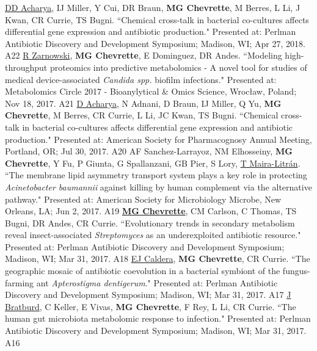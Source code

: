 \begin{cvpubs}
  \cvpub
    {\underline{DD Acharya}, IJ Miller, Y Cui, DR Braun, \textbf{MG Chevrette}, M Berres, L Li, J Kwan, CR Currie, TS Bugni. ``Chemical cross-talk in bacterial co-cultures affects differential gene expression and antibiotic production." Presented at: Perlman Antibiotic Discovery and Development Symposium; Madison, WI; Apr 27, 2018.} %
    {A22} %
  \cvpub
    {\underline{R Zarnowski}, \textbf{MG Chevrette}, E Dominguez, DR Andes. ``Modeling high-throughput proteomics into predictive metabolomics - A novel tool for studies of medical device-associated \textit{Candida spp.} biofilm infections." Presented at: Metabolomics Circle 2017 - Bioanylytical \& Omics Science, Wrocław, Poland; Nov 18, 2017.} %
    {A21} %
  \cvpub
    {\underline{D Acharya}, N Adnani, D Braun, IJ Miller, Q Yu, \textbf{MG Chevrette}, M Berres, CR Currie, L Li, JC Kwan, TS Bugni. ``Chemical cross-talk in bacterial co-cultures affects differential gene expression and antibiotic production." Presented at: American Society for Pharmacognosy Annual Meeting, Portland, OR; Jul 30, 2017.} %
    {A20} %
  \cvpub
    {AF Sanchez-Larrayoz, NM Elhosseiny, \textbf{MG Chevrette}, Y Fu, P Giunta, G Spallanzani, GB Pier, S Lory, \underline{T Maira-Litr\'{a}n}. ``The membrane lipid asymmetry transport system plays a key role in protecting \textit{Acinetobacter baumannii} against killing by human complement via the alternative pathway." Presented at: American Society for Microbiology Microbe, New Orleans, LA; Jun 2, 2017.} %
    {A19} %
  \cvpub
    {\underline{\textbf{MG Chevrette}}, CM Carlson, C Thomas, TS Bugni, DR Andes, CR Currie. ``Evolutionary trends in secondary metabolism reveal insect-associated \textit{Streptomyces} as an underexploited antibiotic resource." Presented at: Perlman Antibiotic Discovery and Development Symposium; Madison, WI; Mar 31, 2017.} %
    {A18} %
  \cvpub
    {\underline{EJ Caldera}, \textbf{MG Chevrette}, CR Currie. ``The geographic mosaic of antibiotic coevolution in a bacterial symbiont of the fungus-farming ant \textit{Apterostigma dentigerum}." Presented at: Perlman Antibiotic Discovery and Development Symposium; Madison, WI; Mar 31, 2017.} %
    {A17} %
  \cvpub
    {\underline{J Bratburd}, C Keller, E Vivas, \textbf{MG Chevrette}, F Rey, L Li, CR Currie. ``The human gut microbiota metabolomic response to infection." Presented at: Perlman Antibiotic Discovery and Development Symposium; Madison, WI; Mar 31, 2017.} %
    {A16} %
\end{cvpubs}
